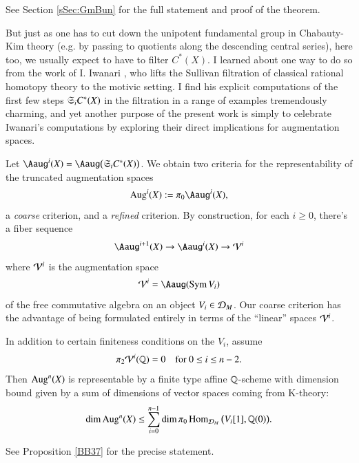 See Section \ref{sSec:GmBun} for the full statement and proof of the theorem.

But just as one has to cut down the unipotent fundamental group in Chabauty-Kim theory (e.g. by passing to quotients along the descending central series), here too, we usually expect to have to filter $C^*(X)$. I learned about one way to do so from the work of I. Iwanari \cite{Iwanari}, who lifts the Sullivan filtration of classical rational homotopy theory to the motivic setting. I find his explicit computations of the first few steps $\mathfrak{S}_iC^*(X)$ in the filtration in a range of examples tremendously charming, and yet another purpose of the present work is simply to celebrate Iwanari's computations by exploring their direct implications for augmentation spaces.

Let $\Aaug^i(X) = \Aaug \big(\fkS_i C^*(X) \big)$. We obtain two criteria for the representability of the truncated augmentation spaces
\[
\Aug^i(X) := \pi_0 \Aaug^i(X), 
\]
a \textit{coarse} criterion, and a \textit{refined} criterion. By construction, for each $i \ge 0$, there's a fiber sequence
\[
\Aaug^{i+1}(X) \to \Aaug^i(X) \to \Vv^i
\]
where $\mathcal{V}^i$ is the augmentation space 
\[
\Vv^i = \Aaug(\Sym V_i)
\]
of the free commutative algebra on an object $V_i \in \mathcal{D}_M$. Our coarse criterion has the advantage of being formulated entirely in terms of the ``linear'' spaces $\mathcal{V}^i$. 

\begin{ssProposition}
\label{IN12}
In addition to certain finiteness conditions on the $V_i$, assume
\[
\pi_2 \mathcal{V}^i(\mathbb{Q}) = 0
\quad  \text{for } 0 \le i \le n-2.
\] 
Then $\operatorname{Aug}^n(X)$ is representable by a finite type affine $\mathbb{Q}$-scheme with dimension bound given by a sum of dimensions of vector spaces coming from K-theory:
\[
\dim \operatorname{Aug}^n(X) 
\le 
\sum_{i=0}^{n-1} 
\dim \pi_0\operatorname{Hom}_{\mathcal{D}_M}\big( V_i[1], \mathbb{Q}(0) \big).
\]
\end{ssProposition}

\noindent
See Proposition \ref{BB37} for the precise statement. 

